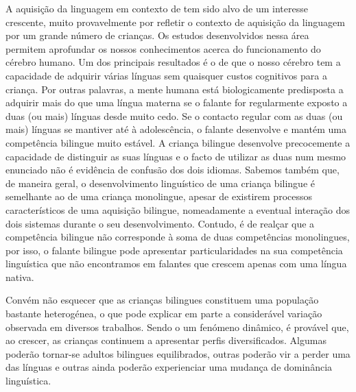 \documentclass[output=paper]{LSP/langsci}
\begin{document}
A aquisição da linguagem em contexto de  tem sido alvo de um interesse crescente, muito provavelmente por refletir o contexto de aquisição da linguagem por um grande número de crianças. Os estudos desenvolvidos nessa área permitem aprofundar os nossos conhecimentos acerca do funcionamento do cérebro humano. Um dos principais resultados é o de que o nosso cérebro tem a capacidade de adquirir várias línguas sem quaisquer custos cognitivos para a criança. Por outras palavras, a mente humana está biologicamente predisposta a adquirir mais do que uma língua materna se o falante for regularmente exposto a duas (ou mais) línguas desde muito cedo. Se o contacto regular com as duas (ou mais) línguas se mantiver até à adolescência, o falante desenvolve e mantém uma competência bilingue muito estável. A criança bilingue desenvolve precocemente a capacidade de distinguir as suas línguas e o facto de utilizar as duas num mesmo enunciado não é evidência de confusão dos dois idiomas. Sabemos também que, de maneira geral, o desenvolvimento linguístico de uma criança bilingue é semelhante ao de uma criança monolingue, apesar de existirem processos característicos de uma aquisição bilingue, nomeadamente a eventual interação dos dois sistemas durante o seu desenvolvimento. Contudo, é de realçar que a competência bilingue não corresponde à soma de duas competências monolingues, por isso, o falante bilingue pode apresentar particularidades na sua competência linguística que não encontramos em falantes que crescem apenas com uma língua nativa.

Convém não esquecer que as crianças bilingues constituem uma população bastante heterogénea, o que pode explicar em parte a considerável variação observada em diversos trabalhos. Sendo o  um fenómeno dinâmico, é provável que, ao crescer, as crianças continuem a apresentar perfis diversificados. Algumas poderão tornar-se adultos bilingues equilibrados, outras poderão vir a perder uma das línguas e outras ainda poderão experienciar uma mudança de dominância linguística. 


{\sloppy
\printbibliography[heading=subbibliography,notkeyword=this]
}
\end{document}
